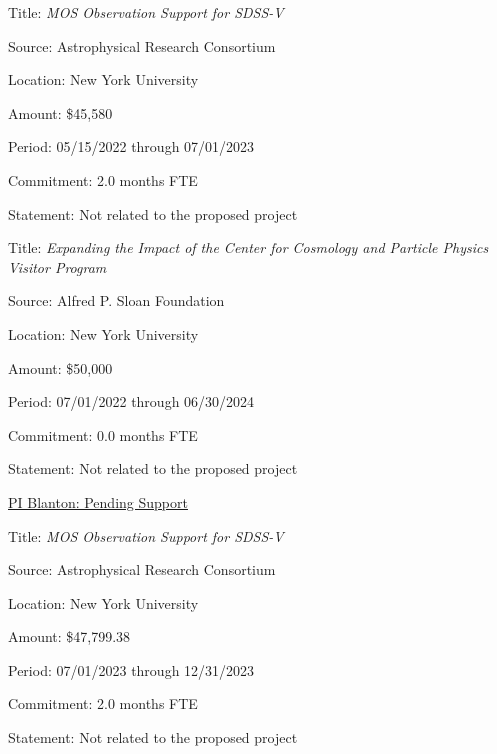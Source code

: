 \documentclass[12pt, preprint]{hacked-aastex}
\begin{document}
\begin{itemize*}
\item[]{Title: {\em MOS Observation Support for SDSS-V}}
\item[]{Source: Astrophysical Research Consortium}
\item[]{Location: New York University}
\item[]{Amount: \$45,580}
\item[]{Period: 05/15/2022 through 07/01/2023}
\item[]{Commitment: 2.0 months FTE}
\item[]{Statement: Not related to the proposed project}
\end{itemize*}

\begin{itemize*}
\item[]{Title: {\em Expanding the Impact of the Center for Cosmology
    and Particle Physics Visitor Program}}
\item[]{Source: Alfred P. Sloan Foundation}
\item[]{Location: New York University}
\item[]{Amount: \$50,000}
\item[]{Period: 07/01/2022 through 06/30/2024}
\item[]{Commitment: 0.0 months FTE}
\item[]{Statement: Not related to the proposed project}
\end{itemize*}

\noindent \underline{PI Blanton: Pending Support}

\begin{itemize*}
\item[]{Title: {\em MOS Observation Support for SDSS-V}}
\item[]{Source: Astrophysical Research Consortium}
\item[]{Location: New York University}
\item[]{Amount: \$47,799.38}
\item[]{Period: 07/01/2023 through 12/31/2023}
\item[]{Commitment: 2.0 months FTE}
\item[]{Statement: Not related to the proposed project}
\end{itemize*}
\end{document}
